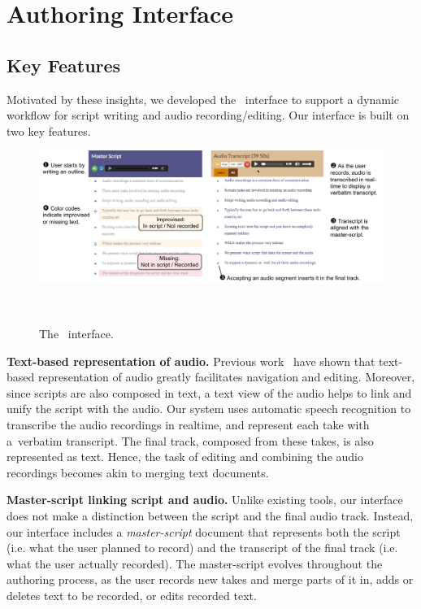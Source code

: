 \section{Authoring Interface}
\subsection{Key Features} Motivated by these insights, we developed the \systemname\  interface to support a dynamic workflow for script writing and  audio recording/editing. Our interface is built on two key features. 

\begin{figure}
  \centering
  \includegraphics[width=2.0\columnwidth]{figures/ui_aligned}
  \caption{The \systemname\ interface. }~\label{fig:ui_aligned}
\end{figure}

\textbf{Text-based representation of audio.} Previous work~\cite{casares2002simplifying,whittaker2004semantic,berthouzoz2012tools,rubin2013content} have shown that text-based representation of audio greatly facilitates navigation and editing. Moreover, since scripts are also composed in text, a text view of the audio  helps to link and unify the script
with the audio.
 Our system uses automatic speech recognition to transcribe the audio recordings in realtime, and represent each take with a\ verbatim transcript. The final track, composed from these takes, is also represented as text. Hence, the task of editing and combining the audio recordings becomes akin to merging text documents. 

\textbf{Master-script linking script and audio.} Unlike existing tools, our interface does not make a distinction between the script and the final audio track. Instead, our interface includes a \textit{master-script} document that represents both the script (i.e. what the user planned to record) and the transcript of the final track (i.e. what the user actually recorded). The master-script evolves throughout the authoring process, as the user records new takes and merge parts of it in, adds or deletes text to be recorded, or edits recorded text. 

